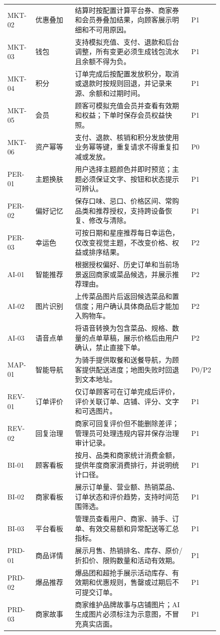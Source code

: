 \begin{longtable}{@{}p{0.10\linewidth}p{0.17\linewidth}p{0.50\linewidth}p{0.08\linewidth}@{}}
MKT-02 & 优惠叠加 & 结算时按配置计算平台券、商家券和会员券叠加结果，向顾客展示明细和不可用原因。 & P1 \\
MKT-03 & 钱包 & 支持模拟充值、支付、退款和后台调整，所有变更必须生成钱包流水且余额不得为负。 & P1 \\
MKT-04 & 积分 & 订单完成后按配置发放积分，取消或退款时按规则回退，并记录来源、余额和过期时间。 & P1 \\
MKT-05 & 会员 & 顾客可模拟充值会员并查看有效期和权益；下单时保存会员权益快照。 & P1 \\
MKT-06 & 资产幂等 & 支付、退款、核销和积分发放使用业务幂等键，重复请求不得重复扣减或发放。 & P0 \\
PER-01 & 主题换肤 & 用户选择主题颜色并即时预览；主题必须保证文字、按钮和状态提示可辨认。 & P1 \\
PER-02 & 偏好记忆 & 保存口味、忌口、价格区间、常购品类和推荐授权，支持跨设备恢复、修改与清除。 & P1 \\
PER-03 & 幸运色 & 可按日期和星座推荐每日幸运色，仅改变视觉主题，不改变价格、权益或排序结果。 & P2 \\
AI-01 & 智能推荐 & 根据授权偏好、历史订单和当前场景返回商家或菜品候选，并展示推荐理由。 & P2 \\
AI-02 & 图片识别 & 上传菜品图片后返回候选菜品和置信度；用户确认具体商品后才能加入购物车。 & P2 \\
AI-03 & 语音点单 & 将语音转换为包含菜品、规格、数量的点单草稿，展示价格后由用户确认，禁止直接下单。 & P2 \\
MAP-01 & 智能导航 & 为骑手提供取餐和送餐导航，为顾客提供配送进度；地图失败时回退到文本地址。 & P0/P2 \\
REV-01 & 订单评价 & 仅订单顾客可在订单完成后评价，评价关联订单、店铺、评分、文字和可选图片。 & P1 \\
REV-02 & 回复治理 & 商家可回复评价但不能删除差评；管理员可处理违规内容并保存治理审计记录。 & P1 \\
BI-01 & 顾客看板 & 按月、品类和商家统计消费金额，提供年度商家消费排行，并说明统计口径。 & P1 \\
BI-02 & 商家看板 & 展示订单量、营业额、热销菜品、订单状态和评价趋势，支持时间范围筛选。 & P1 \\
BI-03 & 平台看板 & 管理员查看用户、商家、骑手、订单、有效交易额和异常配送等汇总指标。 & P1 \\
PRD-01 & 商品详情 & 展示月售、热销排名、库存、原价/折扣价、限购数量和活动有效期。 & P1 \\
PRD-02 & 爆品推荐 & 爆品团和超抢手展示活动库存、有效期和优惠规则，售罄或过期后不可提交订单。 & P1 \\
PRD-03 & 商家故事 & 商家维护品牌故事与店铺图片；AI 生成图片必须标注为示意图，不冒充真实店面。 & P1 \\
\end{longtable}

